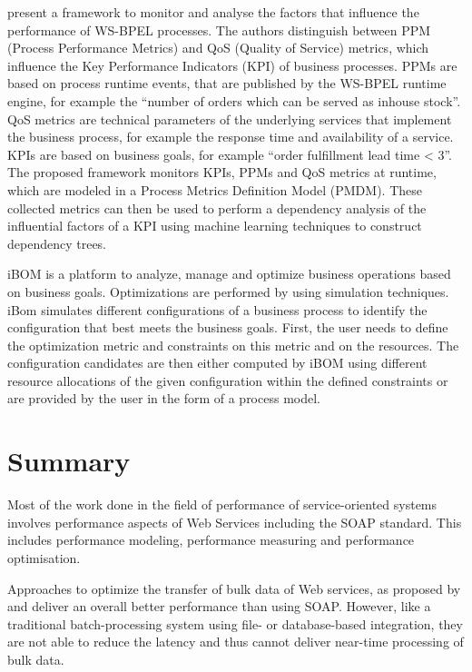 \citet{Wetzstein:2009uq} present a framework to monitor and analyse the factors that influence the performance of WS-BPEL processes. The authors distinguish between PPM (Process Performance Metrics) and QoS (Quality of Service) metrics, which influence the Key Performance Indicators (KPI) of business processes. PPMs are based on process runtime events, that are published by the WS-BPEL runtime engine, for example the ``number of orders which can be served as inhouse stock''. QoS metrics are technical parameters of the underlying services that implement the business process, for example the response time and availability of a service. KPIs are based on business goals, for example ``order fulfillment lead time < 3''. The proposed framework monitors KPIs, PPMs and QoS metrics at runtime, which are modeled in a Process Metrics Definition Model (PMDM). These collected metrics can then be used to perform a dependency analysis of the influential factors of a KPI using machine learning techniques to construct dependency trees.

iBOM \citep{Castellanos:2005fk} is a platform to analyze, manage and optimize business operations based on business goals. Optimizations are performed by using simulation techniques. iBom simulates different configurations of a business process to identify the configuration that best meets the business goals. First, the user needs to define the optimization metric and constraints on this metric and on the resources. The configuration candidates are then either computed by iBOM using different resource allocations of the given configuration within the defined constraints or are provided by the user in the form of a process model. 

\section{Summary}

Most of the work done in the field of performance of service-oriented systems involves performance aspects of Web Services including the SOAP standard. This includes performance modeling, performance measuring and performance optimisation.

Approaches to optimize the transfer of bulk data of Web services, as proposed by \citet{Wichaiwong:2007oq} and  \citet{Habich:2007ij} deliver an overall better performance than using SOAP. However, like a traditional batch-processing system using file- or database-based integration, they are not able to reduce the latency and thus cannot deliver near-time processing of bulk data.

